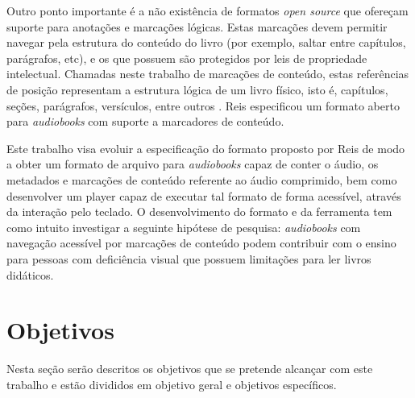 Outro ponto importante é a não existência de formatos \textit{open source} que ofereçam suporte para anotações e marcações lógicas. Estas marcações devem permitir navegar pela estrutura do conteúdo do livro (por exemplo, saltar entre capítulos, parágrafos, etc), e os que possuem são protegidos por leis de propriedade intelectual. Chamadas neste trabalho de marcações de conteúdo, estas referências de posição representam a estrutura lógica de um livro físico, isto é, capítulos, seções, parágrafos, versículos, entre outros \cite{herbert}. Reis especificou um formato aberto para \textit{audiobooks} com suporte a marcadores de conteúdo.

Este trabalho visa evoluir a especificação do formato proposto por Reis de modo a obter um formato de arquivo para \textit{audiobooks} capaz de conter o áudio, os metadados e marcações de conteúdo referente ao áudio comprimido, bem como desenvolver um player capaz de executar tal formato de forma acessível, através da interação pelo teclado. O desenvolvimento do formato e da ferramenta tem como intuito investigar a seguinte hipótese de pesquisa: \textit{audiobooks} com navegação acessível por marcações de conteúdo podem contribuir com o ensino para pessoas com deficiência visual que possuem limitações para ler livros didáticos.


\section{Objetivos}

Nesta seção serão descritos os objetivos que se pretende alcançar com este trabalho e estão divididos em objetivo geral e objetivos específicos.

